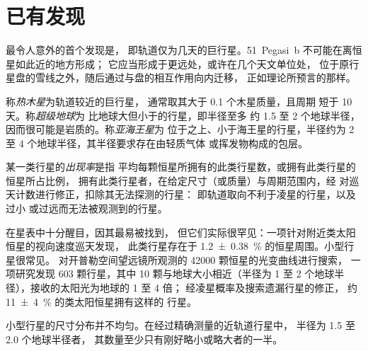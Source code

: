 \section{已有发现}\label{sec:b3:exoplanets:found}

最令人意外的首个发现是，
即轨道仅为几天的巨行星。51~Pegasi~b 不可能在离恒星如此近的地方形成；
它应当形成于更远处，或许在几个天文单位处，
位于原行星盘的雪线之外，随后通过与盘的相互作用向内迁移，
正如理论所预言的那样。

\begin{definition}\label{def:b3:exoplanets:classes}
称\emph{热木星}为轨道较近的巨行星，
通常取其大于 0.1 个木星质量，且周期
短于 10 天。称\emph{超级地球}为
比地球大但小于的行星，即半径至多
约 1.5 至 2 个地球半径，因而很可能是岩质的。称\emph{亚海王星}为
位于之上、小于海王星的行星，半径约为 2 至
4 个地球半径，其半径要求存在由轻质气体
或挥发物构成的包层。
\end{definition}

\begin{definition}[出现率]\label{def:b3:exoplanets:occurrence}
某一类行星的\emph{出现率}是指
平均每颗恒星所拥有的此类行星数，或拥有此类行星的恒星所占比例，
拥有此类行星者，在给定尺寸（或质量）与周期范围内，经
对巡天计数进行修正，扣除其无法探测的行星：
即轨道取向不利于凌星的行星，以及过小
或过远而无法被观测到的行星。
\end{definition}

在星表中十分醒目，因其最易被找到，
但它们实际很罕见：一项针对附近类太阳恒星的视向速度巡天发现，
此类行星存在于 \qty[separate-uncertainty=true]{1.2 \pm 0.38}{\percent} 的恒星周围。小型行星很常见。
对开普勒空间望远镜所观测的 \num{42000} 颗恒星的光变曲线进行搜索，
一项研究发现 603 颗行星，其中 10 颗与地球大小相近（半径为 1 至 2
个地球半径），接收的太阳光为地球的 1 至 4 倍；
经凌星概率及搜索遗漏行星的修正，
约 \qty[separate-uncertainty=true]{11 \pm 4}{\percent} 的类太阳恒星拥有这样的
行星。

小型行星的尺寸分布并不均匀。在经过精确测量的近轨道行星中，
半径为 1.5 至 2.0 个地球半径者，
其数量至少只有刚好略小或略大者的一半。

